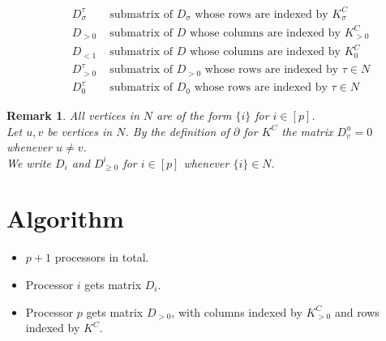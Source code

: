 \documentclass{article}
\newtheorem{remark}[theorem]    {Remark}
\begin{document}
\begin{align*}
    && & D^{\tau}_{\sigma} & \text{ submatrix of $D_{\sigma}$ whose rows are indexed by $K^C_{\sigma}$ } \\
    && & D_{>0} & \text{ submatrix of $D$ whose columns are indexed by $K^C_{>0}$ }  \\
    && & D_{<1}  & \textrm{ submatrix of $D$ whose columns are indexed by $K^C_{0}$} \\
    && & D^{\tau}_{>0} & \text{ submatrix of $D_{>0}$ whose rows are indexed by $\tau \in N$}  \\
    && & D^{\tau}_{0} & \text{ submatrix of $D_{0}$ whose rows are indexed by $\tau \in N$} 
\end{align*}

\begin{remark}  
All vertices in $N$ are of the form $\{i\}$ for $i \in [p]$. \\
Let $u,v$ be vertices in $N$. By the definition of $\partial$ for $K^C$ the matrix $D^{u}_{v} = 0$ whenever $u \neq v$. \\
We write $D_i$  and $D^i_{\geq 0}$ for $i \in [p]$ whenever $\{i\} \in N$.
\end{remark}

\section{Algorithm}
\label{sec:algorithm}

\begin{itemize}
    \item $p+1$ processors in total.
    \item Processor $i$ gets matrix $D_i$.
    \item Processor $p$ gets matrix $D_{>0}$,
          with columns indexed by $K^C_{>0}$ and rows indexed by $K^C$.
\end{itemize}
\end{document}
